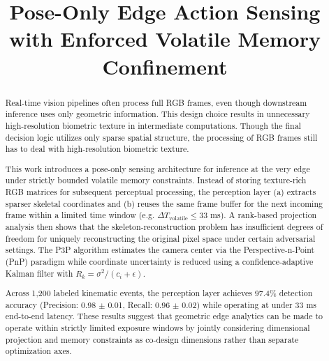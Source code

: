 \documentclass[conference]{IEEEtran}
\begin{document}
\title{Pose-Only Edge Action Sensing with Enforced Volatile Memory Confinement}

\author{
}

\maketitle

\begin{abstract}
Real-time vision pipelines often process full RGB frames, even though downstream inference uses only geometric information. This design choice results in unnecessary high-resolution biometric texture in intermediate computations. Though the final decision logic utilizes only sparse spatial structure, the processing of RGB frames still has to deal with high-resolution biometric texture.

This work introduces a pose-only sensing architecture for inference at the very edge under strictly bounded volatile memory constraints. Instead of storing texture-rich RGB matrices for subsequent perceptual processing, the perception layer (a) extracts sparser skeletal coordinates and (b) reuses the same frame buffer for the next incoming frame within a limited time window (e.g. $\Delta T_{\text{volatile}} \le 33$ ms). A rank-based projection analysis then shows that the skeleton-reconstruction problem has insufficient degrees of freedom for uniquely reconstructing the original pixel space under certain adversarial settings. The P3P algorithm estimates the camera center via the Perspective-n-Point (PnP) paradigm while coordinate uncertainty is reduced using a confidence-adaptive Kalman filter with $R_k = \sigma^2 / (c_i + \epsilon)$.

Across 1,200 labeled kinematic events, the perception layer achieves 97.4\% detection accuracy (Precision: 0.98 $\pm$ 0.01, Recall: 0.96 $\pm$ 0.02) while operating at under 33 ms end-to-end latency. These results suggest that geometric edge analytics can be made to operate within strictly limited exposure windows by jointly considering dimensional projection and memory constraints as co-design dimensions rather than separate optimization axes.
\end{abstract}
\end{document}
